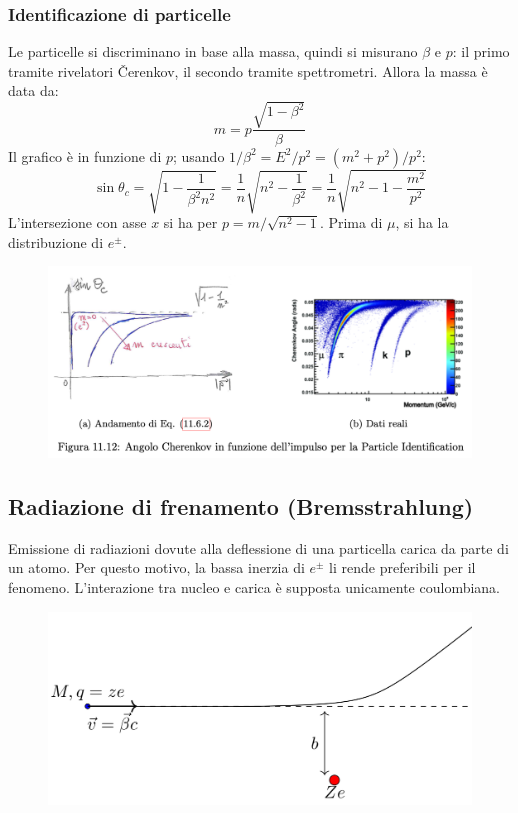 \documentclass[10pt, a4paper]{scrartcl}
\numberwithin{equation}{subsection}
\theoremstyle{style1}
\begin{document}
\subsubsection{Identificazione di particelle}
Le particelle si discriminano in base alla massa, quindi si misurano $\beta $ e $p$: il primo tramite rivelatori \v Cerenkov, il secondo tramite spettrometri. Allora la massa \`e data da:
\begin{equation}
	m = p \frac{\sqrt{ 1- \beta ^2} }{\beta }
\end{equation}
Il grafico \`e in funzione di $p$; usando $1/\beta ^2 = E^2 / p^2 = (m^2 + p^2)/p^2$:
\begin{equation}
\sin \theta _c = \sqrt{1- \frac{1}{\beta ^2 n ^2}} = \frac{1}{n} \sqrt{n^2 - \frac{1}{\beta ^2}} = \frac{1}{n} \sqrt{n^2 - 1- \frac{m^2 }{p^2}} 
\end{equation}
L'intersezione con asse $x$ si ha per $p = m / \sqrt{n^2 - 1} $. Prima di $\mu $, si ha la distribuzione di $e^{\pm} $.
\begin{figure}[h!]
	\centering
	\includegraphics[width=.8\columnwidth]{pid.png}
\end{figure}
\subsection{Radiazione di frenamento (Bremsstrahlung)}
Emissione di radiazioni dovute alla deflessione di una particella carica da parte di un atomo. Per questo motivo, la bassa inerzia di $e^{\pm} $ li rende preferibili per il fenomeno. L'interazione tra nucleo e carica \`e supposta unicamente coulombiana.
\begin{figure}[h!]
	\centering
	\includegraphics[width=.5\columnwidth]{b1.png}
\end{figure}
\end{document}
